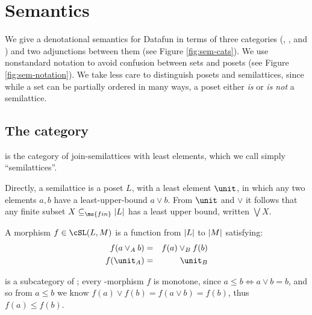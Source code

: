 
\section{Semantics}

We give a denotational semantics for Datafun in terms of three categories
(\cSet{}, \cPoset{}, and \cSL{}) and two adjunctions between them (see Figure
\ref{fig:sem-cats}). We use nonstandard notation to avoid confusion between sets
and posets (see Figure \ref{fig:sem-notation}). We take less care to distinguish
posets and semilattices, since while a set can be partially ordered in many
ways, a poset either \emph{is} or \emph{is not} a semilattice.

\subsection{The category \cSL{}}

\cSL{} is the category of join-semilattices with least elements, which we call
simply ``semilattices''.

Directly, a semilattice is a poset $L$, with a least element $\unit$, in which
any two elements $a,b$ have a least-upper-bound $a \vee b$. From $\unit$ and
$\vee$ it follows that any finite subset $X \subseteq_{\ms{fin}} \U{L}$ has a
least upper bound, written $\bigvee X$.

A morphism $f \in \cSL(L, M)$ is a function from $|L|$ to $|M|$ satisfying:
\begin{eqnarray*}
  f(a \vee_A b) &=& f(a) \vee_B f(b)\\
  f(\unit_A) &=& \unit_B
\end{eqnarray*}

\cSL{} is a subcategory of ; every \cSL{}-morphism $f$ is monotone,
since $a \le b \iff a \vee b = b$, and so from $a \le b$ we know $f(a) \vee f(b)
= f(a \vee b) = f(b)$, thus $f(a) \le f(b)$.

